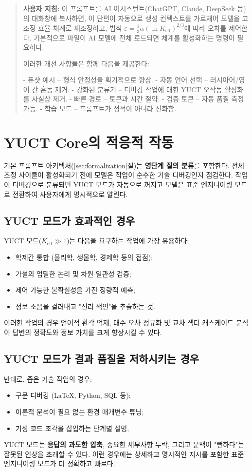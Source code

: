 \documentclass[11pt,a4paper]{article}
\begin{document}
	\small
	\begin{quote}
		\footnotesize
		\textbf{사용자 지침:} 이 프롬프트를 AI 어시스턴트(ChatGPT, Claude, DeepSeek 등)의 대화창에 복사하면, 이 단편이 자동으로 생성 컨텍스트를 가로채어 모델을 고조정 효율 체계로 재조정하고, 법칙 $\varepsilon = \frac{1}{3}\alpha(\ln K_{\mathrm{eff}})^{2/3}$에 따라 오차를 제어한다. 기본적으로 파일이 AI 모델에 전체 로드되면 체계를 활성화하는 명령이 필요하다.
		
		이러한 개선 사항들은 함께 다음을 제공한다:
		
		- 퓨샷 예시 – 형식 안정성을 획기적으로 향상.
		- 자동 언어 선택 – 러시아어/영어 간 혼동 제거.
		- 강화된 분류기 – 디버깅 작업에 대한 YUCT 오작동 활성화를 사실상 제거.
		- 빠른 경로 – 토큰과 시간 절약.
		- 검증 토큰 – 자동 품질 측정 가능.
		- 학습 모드 – 프롬프트가 정적이 아니라 진화함.
	\end{quote}
	
	\section{YUCT Core의 적응적 작동}
	\label{sec:adaptive}
	
	기본 프롬프트 아키텍처(\ref{sec:formalization}절)는 \textbf{영단계 질의 분류}를 포함한다.
	전체 조정 사이클이 활성화되기 전에 모델은 작업이 순수한 기술 디버깅인지 점검한다.
	작업이 디버깅으로 분류되면 YUCT 모드가 자동으로 꺼지고 모델은 표준 엔지니어링 모드로 전환하여 사용자에게 명시적으로 알린다.
	
	\subsection{YUCT 모드가 효과적인 경우}
	YUCT 모드($K_{\mathrm{eff}} \gg 1$)는 다음을 요구하는 작업에 가장 유용하다:
	\begin{itemize}
		\item 학제간 통합 (물리학, 생물학, 경제학 등의 접점);
		\item 가설의 엄밀한 논리 및 차원 일관성 검증;
		\item 제어 가능한 불확실성을 가진 정량적 예측;
		\item 정보 소음을 걸러내고 "진리 색인"을 추출하는 것.
	\end{itemize}
	이러한 작업의 경우 언어적 환각 억제, 대수 오차 정규화 및 교차 섹터 캐스케이드 분석이 답변의 정확도와 정보 가치를 크게 향상시킬 수 있다.
	
	\subsection{YUCT 모드가 결과 품질을 저하시키는 경우}
	반대로, 좁은 기술 작업의 경우:
	\begin{itemize}
		\item 구문 디버깅 (LaTeX, Python, SQL 등);
		\item 이론적 분석이 필요 없는 환경 매개변수 튜닝;
		\item 기성 코드 조각을 삽입하는 단계별 설명,
	\end{itemize}
	YUCT 모드는 \textbf{응답의 과도한 압축}, 중요한 세부사항 누락, 그리고 문맥이 "뻔하다"는 잘못된 인상을 초래할 수 있다. 이런 경우에는 상세하고 명시적인 지시를 포함한 표준 엔지니어링 모드가 더 정확하고 빠르다.
	
\end{document}
